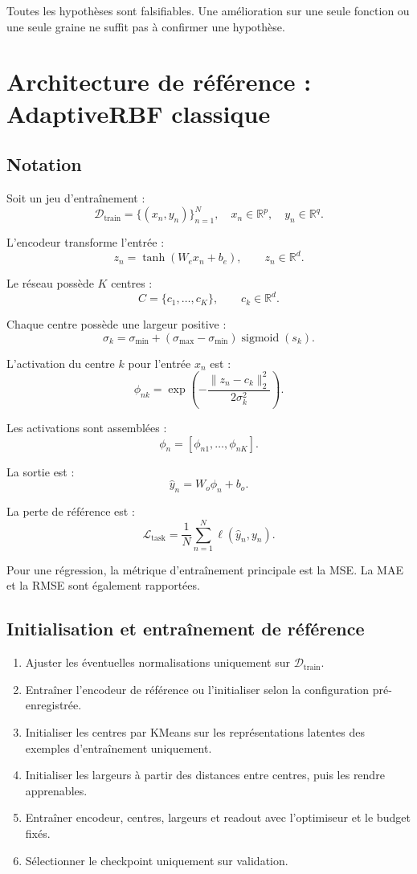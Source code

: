 \documentclass[11pt,a4paper]{article}
\begin{document}
Toutes les hypothèses sont falsifiables. Une amélioration sur une seule
fonction ou une seule graine ne suffit pas à confirmer une hypothèse.

\section{Architecture de référence : AdaptiveRBF classique}

\subsection{Notation}

Soit un jeu d'entraînement :
\[
\mathcal{D}_{\mathrm{train}}
=\{(x_n,y_n)\}_{n=1}^{N},
\quad x_n\in\mathbb{R}^{p},
\quad y_n\in\mathbb{R}^{q}.
\]

L'encodeur transforme l'entrée :
\[
z_n=\tanh(W_e x_n+b_e),
\qquad z_n\in\mathbb{R}^{d}.
\]

Le réseau possède \(K\) centres :
\[
C=\{c_1,\ldots,c_K\},\qquad c_k\in\mathbb{R}^{d}.
\]

Chaque centre possède une largeur positive :
\[
\sigma_k=\sigma_{\min}
+(\sigma_{\max}-\sigma_{\min})\operatorname{sigmoid}(s_k).
\]

L'activation du centre \(k\) pour l'entrée \(x_n\) est :
\[
\phi_{nk}
=
\exp\left(
-\frac{\|z_n-c_k\|_2^2}{2\sigma_k^2}
\right).
\]

Les activations sont assemblées :
\[
\phi_n=[\phi_{n1},\ldots,\phi_{nK}].
\]

La sortie est :
\[
\hat y_n=W_o\phi_n+b_o.
\]

La perte de référence est :
\[
\mathcal{L}_{\mathrm{task}}
=
\frac{1}{N}\sum_{n=1}^{N}
\ell(\hat y_n,y_n).
\]

Pour une régression, la métrique d'entraînement principale est la MSE.
La MAE et la RMSE sont également rapportées.

\subsection{Initialisation et entraînement de référence}

\begin{enumerate}
  \item Ajuster les éventuelles normalisations uniquement sur
  \(\mathcal{D}_{\mathrm{train}}\).
  \item Entraîner l'encodeur de référence ou l'initialiser selon
  la configuration pré-enregistrée.
  \item Initialiser les centres par KMeans sur les représentations
  latentes des exemples d'entraînement uniquement.
  \item Initialiser les largeurs à partir des distances entre centres,
  puis les rendre apprenables.
  \item Entraîner encodeur, centres, largeurs et readout avec
  l'optimiseur et le budget fixés.
  \item Sélectionner le checkpoint uniquement sur validation.
\end{enumerate}
\end{document}
